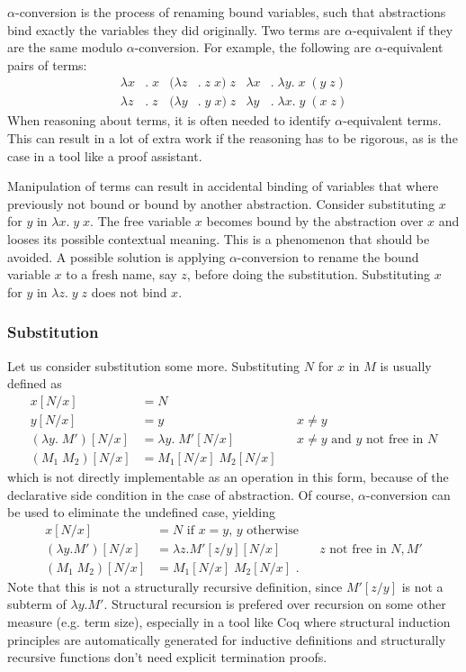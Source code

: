 \documentclass[a4paper,11pt]{article}
\begin{document}
$\alpha$-conversion is the process of renaming bound variables, such
that abstractions bind exactly the variables they did originally.
Two terms are $\alpha$-equivalent if they are the same modulo
$\alpha$-conversion.
For example, the following are $\alpha$-equivalent pairs of terms:
\begin{align*}
  \lambda x&. \; x & (\lambda z&. \; z \; x) \; z & \lambda x&. \; \lambda y. \; x \; (y \; z)\\
  \lambda z&. \; z & (\lambda y&. \; y \; x) \; z & \lambda y&. \; \lambda x. \; y \; (x \; z)
\end{align*}
When reasoning about terms, it is often needed to identify $\alpha$-equivalent
terms.
This can result in a lot of extra work if the reasoning has to be rigorous,
as is the case in a tool like a proof assistant.

Manipulation of terms can result in accidental binding of variables that
where previously not bound or bound by another abstraction.
Consider substituting $x$ for $y$ in $\lambda x. \; y \; x$.
The free variable $x$ becomes bound by the abstraction over $x$ and looses
its possible contextual meaning.
This is a phenomenon that should be avoided.
A possible solution is applying $\alpha$-conversion to rename the bound
variable $x$ to a fresh name, say $z$, before doing the substitution.
Substituting $x$ for $y$ in $\lambda z. \; y \; z$ does not bind $x$.

\subsubsection*{Substitution}

Let us consider substitution some more.
Substituting $N$ for $x$ in $M$ is usually defined as
\begin{align*}
  x[N/x]                 &= N\\
  y[N/x]                 &= y                      && \text{$x \neq y$} \\
  (\lambda y.\; M')[N/x] &= \lambda y. \; M'[N/x]  && \text{$x \neq y$ and $y$ not free in $N$} \\ %
  (M_1 \; M_2)[N/x]      &= M_1[N/x] \; M_2[N/x]
\end{align*}
which is not directly implementable as an operation in this form, because
of the declarative side condition in the case of abstraction.
Of course, $\alpha$-conversion can be used to eliminate the undefined
case, yielding
\begin{align*}
  x[N/x]              &= \text{$N$ if $x = y$, $y$ otherwise}\\
  (\lambda y.M')[N/x] &= \lambda z.M'[z/y][N/x]  && \text{$z$ not free in $N, M'$} \\ %
  (M_1 \; M_2)[N/x]   &= M_1[N/x] \; M_2[N/x] \text{ .}
\end{align*}
Note that this is not a structurally recursive definition, since
$M'[z/y]$ is not a subterm of $\lambda y.M'$.
Structural recursion is prefered over recursion on some other measure
(e.g. term size), especially in a tool like Coq where structural
induction principles are automatically generated for inductive
definitions and structurally recursive functions don't need explicit
termination proofs.
\end{document}
